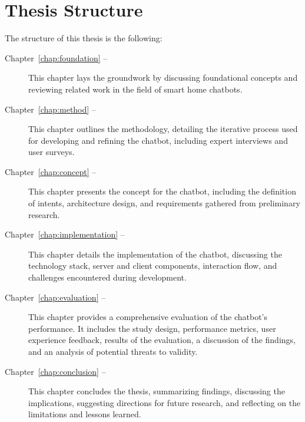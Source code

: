 \section*{Thesis Structure}
The structure of this thesis is the following:
\begin{description}
    \item[Chapter~\ref{chap:foundation} -- ] This chapter lays the groundwork by discussing foundational concepts and reviewing related work in the field of smart home chatbots.
    \item[Chapter~\ref{chap:method} -- ] This chapter outlines the methodology, detailing the iterative process used for developing and refining the chatbot, including expert interviews and user surveys.
    \item[Chapter~\ref{chap:concept} -- ] This chapter presents the concept for the chatbot, including the definition of intents, architecture design, and requirements gathered from preliminary research.
    \item[Chapter~\ref{chap:implementation} -- ] This chapter details the implementation of the chatbot, discussing the technology stack, server and client components, interaction flow, and challenges encountered during development.
    \item[Chapter~\ref{chap:evaluation} -- ] This chapter provides a comprehensive evaluation of the chatbot's performance. It includes the study design, performance metrics, user experience feedback, results of the evaluation, a discussion of the findings, and an analysis of potential threats to validity.
    \item[Chapter~\ref{chap:conclusion} -- ] This chapter concludes the thesis, summarizing findings, discussing the implications, suggesting directions for future research, and reflecting on the limitations and lessons learned.
\end{description}
